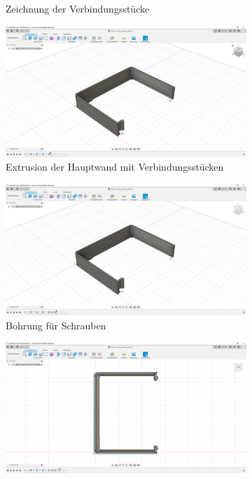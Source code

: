 \begin{figure}[h!tb]
\begin{subfigure}[t]{.3\linewidth}
		\caption[Zeichnung der Verbindungsstücke]{Zeichnung der Verbindungsstücke}
		\label{fig:design-left-06}
	\end{subfigure}
	\begin{subfigure}[t]{.3\linewidth}
		\includegraphics[width=\linewidth]{img/konstruktion_gehaeuse_links_007.png}
		\caption[Extrusion der Hauptwand mit Verbindungsstücken]{Extrusion der Hauptwand mit Verbindungsstücken}
		\label{fig:design-left-07}
	\end{subfigure}
	\begin{subfigure}[t]{.3\linewidth}
		\includegraphics[width=\linewidth]{img/konstruktion_gehaeuse_links_008.png}
		\caption[Bohrung für Schrauben]{Bohrung für Schrauben}
		\label{fig:design-left-08}
	\end{subfigure}
	\begin{subfigure}[t]{.3\linewidth}
		\includegraphics[width=\linewidth]{img/konstruktion_gehaeuse_links_009.png}

\end{subfigure}
\end{figure}
